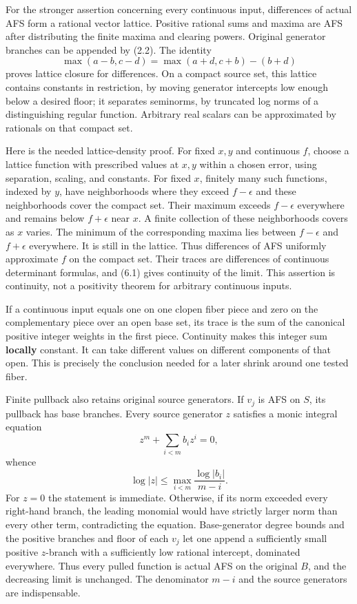 \documentclass[
  10pt,
]{article}
\begin{document}
For the stronger assertion concerning every continuous input,
differences of actual AFS form a rational vector lattice. Positive
rational sums and maxima are AFS after distributing the finite maxima
and clearing powers. Original generator branches can be appended by
(2.2). The identity \[\max(a-b,c-d)=\max(a+d,c+b)-(b+d)\] proves lattice
closure for differences. On a compact source set, this lattice contains
constants in restriction, by moving generator intercepts low enough
below a desired floor; it separates seminorms, by truncated log norms of
a distinguishing regular function. Arbitrary real scalars can be
approximated by rationals on that compact set.

Here is the needed lattice-density proof. For fixed \(x,y\) and
continuous \(f\), choose a lattice function with prescribed values at
\(x,y\) within a chosen error, using separation, scaling, and constants.
For fixed \(x\), finitely many such functions, indexed by \(y\), have
neighborhoods where they exceed \(f-\epsilon\) and these neighborhoods
cover the compact set. Their maximum exceeds \(f-\epsilon\) everywhere
and remains below \(f+\epsilon\) near \(x\). A finite collection of
these neighborhoods covers as \(x\) varies. The minimum of the
corresponding maxima lies between \(f-\epsilon\) and \(f+\epsilon\)
everywhere. It is still in the lattice. Thus differences of AFS
uniformly approximate \(f\) on the compact set. Their traces are
differences of continuous determinant formulas, and (6.1) gives
continuity of the limit. This assertion is continuity, not a positivity
theorem for arbitrary continuous inputs.

If a continuous input equals one on one clopen fiber piece and zero on
the complementary piece over an open base set, its trace is the sum of
the canonical positive integer weights in the first piece. Continuity
makes this integer sum \textbf{locally} constant. It can take different
values on different components of that open. This is precisely the
conclusion needed for a later shrink around one tested fiber.

Finite pullback also retains original source generators. If \(v_j\) is
AFS on \(S\), its pullback has base branches. Every source generator
\(z\) satisfies a monic integral equation \[z^m+\sum_{i<m}b_i z^i=0,\]
whence \[\log|z|\le\max_{i<m}\frac{\log|b_i|}{m-i}.\tag{6.2}\] For
\(z=0\) the statement is immediate. Otherwise, if its norm exceeded
every right-hand branch, the leading monomial would have strictly larger
norm than every other term, contradicting the equation. Base-generator
degree bounds and the positive branches and floor of each \(v_j\) let
one append a sufficiently small positive \(z\)-branch with a
sufficiently low rational intercept, dominated everywhere. Thus every
pulled function is actual AFS on the original \(B\), and the decreasing
limit is unchanged. The denominator \(m-i\) and the source generators
are indispensable.
\end{document}
